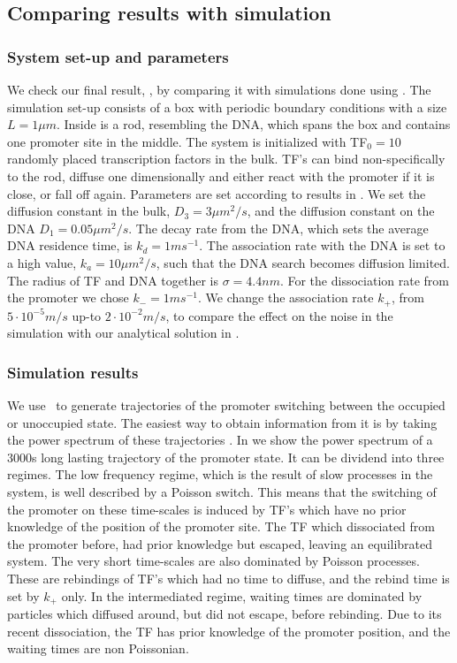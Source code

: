 \subsection{Comparing results with simulation}

\subsubsection{System set-up and parameters}
We check our final result, , by comparing it with simulations done using \GFRD. The simulation set-up consists of a box with periodic boundary conditions with a size $L=1\mu m$. Inside is a rod, resembling the DNA, which spans the box and contains one promoter site in the middle. The system is initialized with TF$_0=10$ randomly placed transcription factors in the bulk. TF's can bind non-specifically to the rod, diffuse one dimensionally and either react with the promoter if it is close, or fall off again. Parameters are set according to results in \cite{Elf2007a}. We set the diffusion constant in the bulk, $D_3=3 \mu m^2/s$, and the diffusion constant on the DNA $D_1=0.05 \mu m^2/s$. The decay rate from the DNA, which sets the average DNA residence time, is $k_d=1ms^{-1}$. The association rate with the DNA is set to a high value, $k_a=10\mu m^2/s$, such that the DNA search becomes diffusion limited. The radius of TF and DNA together is $\sigma=4.4nm$. For the dissociation rate from the promoter we chose $k_-=1 ms^{-1}$. We change the association rate $k_+$, from $5\cdot10^{-5} m/s$ up-to $2\cdot10^{-2} m/s$, to compare the effect on the noise in the simulation with our analytical solution in . 

\subsubsection{Simulation results}
We use \GFRD\, to generate trajectories of the promoter switching between the occupied or unoccupied state. The easiest way to obtain information from it is by taking the power spectrum of these trajectories \cite{Tkacik2009,VanZon2006}. In  we show the power spectrum of a 3000s long lasting trajectory of the promoter state. It can be dividend into three regimes. The low frequency regime, which is the result of slow processes in the system, is well described by a Poisson switch. This means that the switching of the promoter on these time-scales is induced by TF's which have no prior knowledge of the position of the promoter site. The TF which dissociated from the promoter before, had prior knowledge but escaped, leaving an equilibrated system. The very short time-scales are also dominated by Poisson processes. These are rebindings of TF's which had no time to diffuse, and the rebind time is set by $k_+$ only. In the intermediated regime, waiting times are dominated by particles which diffused around, but did not escape, before rebinding. Due to its recent dissociation, the TF has prior knowledge of the promoter position, and the waiting times are non Poissonian.

